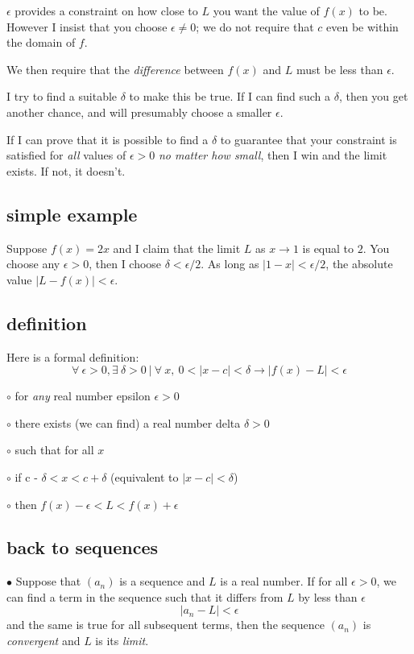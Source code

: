 \documentclass[11pt, oneside]{article}   	%
\begin{document}
$\epsilon$ provides a constraint on how close to $L$ you want the value of $f(x)$ to be.  However I insist that you choose $\epsilon \ne 0$;  we do not require that $c$ even be within the domain of $f$.

We then require that the \emph{difference} between $f(x)$ and $L$ must be less than $\epsilon$.

I try to find a suitable $\delta$ to make this be true.  If I can find such a $\delta$, then you get another chance, and will presumably choose a smaller $\epsilon$.  

If I can prove that it is possible to find a $\delta$ to guarantee that your constraint is satisfied for \emph{all} values of $\epsilon > 0$ \emph{no matter how small}, then I win and the limit exists.  If not, it doesn't.

\subsection*{simple example}
Suppose $f(x) = 2x$ and I claim that the limit $L$ as $x \rightarrow 1$ is equal to $2$.  You choose any $\epsilon > 0$, then I choose $\delta < \epsilon/2$.  As long as $|1 - x| < \epsilon/2$, the absolute value $|L - f(x)| < \epsilon$. 

\subsection*{definition}
Here is a formal definition:
\[ \forall \ \epsilon > 0, \exists \ \delta > 0 \ | \ \forall \ x, \ 0 < | x - c| < \delta \rightarrow | f(x) - L | < \epsilon \]

$\circ$  for \emph{any} real number epsilon $\epsilon > 0$

$\circ$  there exists (we can find) a real number delta $\delta > 0$ 

$\circ$  such that for all $x$

$\circ$  if c - $\delta < x  < c + \delta$ (equivalent to $ | x - c| < \delta$)

$\circ$  then $f(x) - \epsilon < L  < f(x) + \epsilon$

\subsection*{back to sequences}
$\bullet$  Suppose that $(a_n)$ is a sequence and $L$ is a real number. If for all $\epsilon > 0$, we can find a term in the sequence such that it differs from $L$ by less than $\epsilon$ 
\[ |a_n - L | < \epsilon \]
and the same is true for all subsequent terms, then the sequence $(a_n)$ is \emph{convergent} and $L$ is its \emph{limit}.
\end{document}
